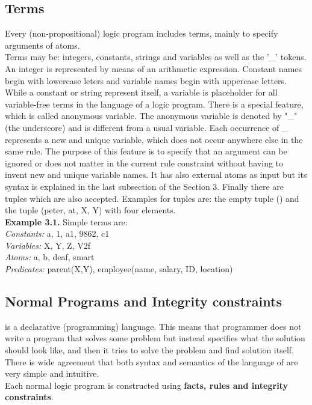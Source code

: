 \documentclass[14pt,a4paper, titlepage]{article}
\begin{document}
\subsection{Terms}
Every (non-propositional) logic program includes terms, mainly to specify arguments of atoms. \\Terms may be: integers, constants, strings and variables as well as the '\_' tokens. An integer is represented by means of an arithmetic expression. Constant names begin with lowercase leters and variable names begin with uppercase letters. \\ While a constant or string represent itself, a variable is placeholder for all variable-free terms in the language of a logic program. There is a special feature, which is called anonymous variable. The anonymous variable is denoted by "\_" (the underscore) and is different from a usual variable. Each occurrence of \_ represents a new and unique variable, which does not occur anywhere else in the same rule. The purpose of this feature is to specify that an argument can be ignored or does not matter in the current rule constraint without having to invent new and unique variable names.  It has also external atoms as input but its syntax is explained in the last subsection of the Section 3. Finally there are tuples which are also accepted. Examples for tuples are: the empty tuple () and the tuple (peter, at, X, Y) with four elements.\bigskip%
\\ \textbf{Example 3.1.} 
Simple terms are:
\\ \textit{Constants:} a, 1, a1, 9862, c1
\\ \textit{Variables:} X, Y, Z, V2f
\\ \textit{Atoms:} a, b, deaf, smart
\\ \textit{Predicates:} parent(X,Y), employee(name, salary, ID, location)
       

\subsection{Normal Programs and Integrity constraints}
\dlvhex{} is a declarative (programming) language. This means that programmer does not write a program that solves some problem but instead specifies what the solution should look like, and then it tries to solve the problem and find solution itself. There is wide agreement that both syntax and semantics of the language of \dlvhex{} are very simple and intuitive.\\ Each normal logic program is constructed using \textbf{facts, rules and integrity constraints}. 
\end{document}
